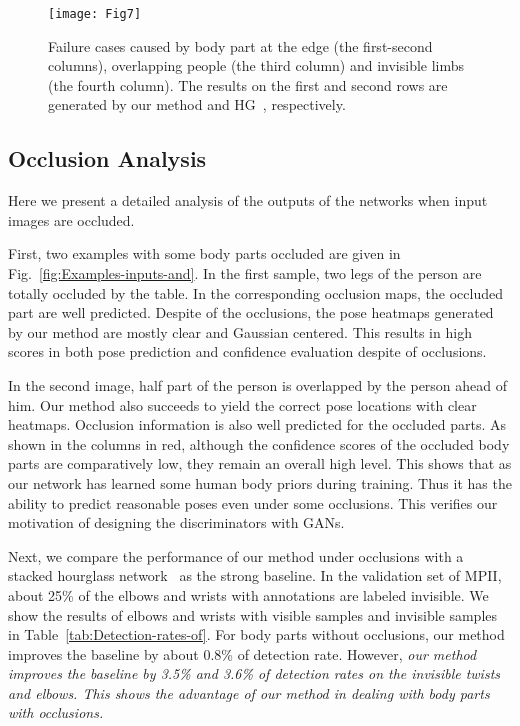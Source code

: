 \documentclass[10pt,letterpaper,twocolumn]{article}
\begin{document}
\begin{figure*}[h!]
\centering
\texttt{[image: Fig7]}
\caption{Failure cases caused by body part at the edge (the first-second columns), overlapping people (the third column) and invisible limbs (the fourth column). The results on the first and second rows are generated by our method and HG~\cite{conf/eccv/NewellYD16}, respectively.}
\label{fig:Failure-cases-caused}
\end{figure*}


\subsection{Occlusion Analysis}\label{subsec:Comparison-of-Predicted-1}

Here we present  a detailed analysis of the outputs of the networks when input images are occluded.

First, two examples with some body parts occluded are given in Fig.~\ref{fig:Examples-inputs-and}. In the first sample, two legs of the person are totally occluded by the table. In the corresponding occlusion maps, the occluded part are well predicted. Despite of the occlusions, the pose heatmaps generated
by our method are mostly clear and Gaussian centered. This results in high scores in both pose prediction and confidence evaluation despite of occlusions.

In the second image, half part of the person is overlapped by the person ahead of him. Our method also succeeds to yield the correct pose locations with clear heatmaps. Occlusion information is also well predicted for the occluded parts. As shown in the columns in red, although the confidence scores of the occluded body parts are comparatively low, they remain an overall high level. This shows that as our network has learned  some human body priors  during training. Thus it has the ability to predict reasonable poses even under some occlusions. This verifies our motivation of designing the discriminators with GANs.

Next, we compare the performance of our method under occlusions with a stacked hourglass network~\cite{conf/eccv/NewellYD16} as the strong baseline. In the validation set of MPII, about 25\% of the elbows and wrists with annotations are labeled invisible. We show the results of elbows and wrists with visible samples and invisible samples in Table~\ref{tab:Detection-rates-of}. For body parts without occlusions, our method improves the baseline by about 0.8\% of detection rate. However, {\it our method improves the baseline by 3.5\% and 3.6\% of detection rates on the invisible twists and elbows. This shows the advantage of our method in dealing with body parts with occlusions.}
\end{document}
